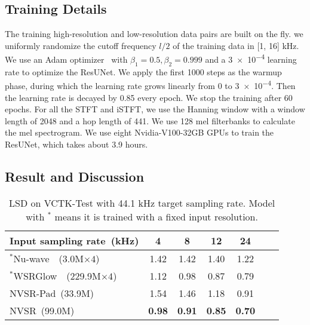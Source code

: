 \documentclass[a4paper]{article}
\begin{document}
\subsection{Training Details}
The training high-resolution and low-resolution data pairs are built on the fly. we uniformly randomize the cutoff frequency ${l/2}$ of the training data in [\num{1}, \num{16}] kHz. We use an Adam optimizer~\cite{kingma2014adam} with $\beta_1=0.5,\beta_2=0.999$ and a \num{3e-4} learning rate to optimize the ResUNet. We apply the first \num{1000} steps as the warmup phase, during which the learning rate grows linearly from \num{0} to \num{3e-4}. Then the learning rate is decayed by \num{0.85} every epoch. We stop the training after \num{60} epochs. For all the STFT and iSTFT, we use the Hanning window with a window length of \num{2048} and a hop length of \num{441}. We use \num{128} mel filterbanks to calculate the mel spectrogram. We use eight Nvidia-V100-32GB GPUs to train the ResUNet, which takes about \num{3.9} hours.

\subsection{Result and Discussion}
\label{sec:result}
\begin{table}[tbp]
\centering
\caption{LSD on VCTK-Test with 44.1 kHz target sampling rate. Model with $^{*}$ means it is trained with a fixed input resolution.}
\label{tab:48k}
\begin{tabular}{@{}lcccccl@{}}
\toprule
Input sampling rate~(kHz)   & 4 & 8 & 12 & 24  \\ \midrule
$^{*}$Nu-wave~\cite{nu-wave-lee2021nu}~(3.0M$\times 4$) &  1.42  &  1.42  &  1.40 & 1.22     \\
$^{*}$WSRGlow~\cite{zhang2021wsrglow}~(229.9M$\times 4$) & 1.12  & 0.98 & 0.87  & 0.79    \\
NVSR-Pad~(33.9M)    & 1.54 & 1.46 & 1.18 & 0.91    \\
NVSR~(99.0M)    & \textbf{0.98} & \textbf{0.91} & \textbf{0.85} & \textbf{0.70}    \\ \bottomrule
\end{tabular}
\end{table}
\end{document}
